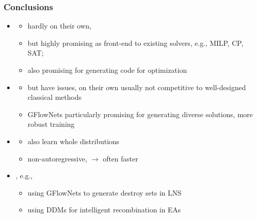 \documentclass[aspectratio=1610]{beamer}
\newcommand{\important}[1]{{\color{green!60!black}#1}}
\begin{document}
\begin{frame}
	\frametitle{Conclusions}
	\medskip
	\begin{itemize}
		\itemsep2.5ex
		\item {}
		\begin{itemize}
			\item \alert{hardly on their own},
			\item but highly \important{promising as front-end} to existing solvers, e.g., MILP, CP, SAT;
			\item also promising for \important{generating code for optimization}
		\end{itemize}
		\item {}
		\begin{itemize}
			\item but \alert{have issues, on their own usually not competitive} to well-designed classical methods
			\item \important{GFlowNets particularly promising} for generating diverse solutions, more robust training
		\end{itemize}
		\item {}
		\begin{itemize}
			\item also \important{learn whole distributions}
			\item non-autoregressive, \(\rightarrow\) \important{often faster}
		\end{itemize} 
		\item {}, e.g.,
		\begin{itemize}
			\item using GFlowNets to generate destroy sets in LNS
			\item using DDMs for intelligent recombination in EAs		
		\end{itemize}
	\end{itemize}
\end{frame}
\end{document}

